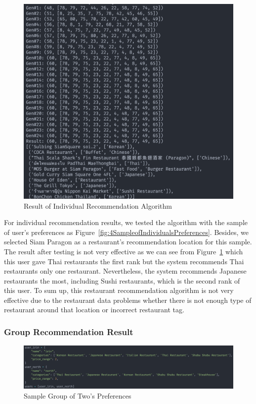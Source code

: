 \documentclass[12pt,oneside,openright,a4paper]{cpe-english-project}
\begin{document}
\begin{figure}[H]\centering
\includegraphics[width=350pt]{./images/4ResultofIndividualRecommendationAlgorithm.png}
\caption{Result of Individual Recommendation Algorithm}\label{fig:4ResultofIndividualRecommendationAlgorithm}
\end{figure}\vspace{-24pt}

For individual recommendation results, we tested the algorithm with the sample of user’s preferences as Figure~\ref{fig:4SampleofIndividualsPreferences}. Besides, we selected Siam Paragon as a restaurant's recommendation location for this sample. The result after testing is not very effective as we can see from Figure~\ref{fig:4ResultofIndividualRecommendationAlgorithm} which this user gave Thai restaurants the first rank but the system recommends Thai restaurants only one restaurant. Nevertheless, the system recommends Japanese restaurants the most, including Sushi restaurants, which is the second rank of this user. To sum up, this restaurant recommendation algorithm is not very effective due to the restaurant data problems whether there is not enough type of restaurant around that location or incorrect restaurant tag.

\subsubsection{Group Recommendation Result}

\begin{figure}[H]\centering
\includegraphics[width=350pt]{./images/4SampleGroupofTwosPreferences.png}
\caption{Sample Group of Two’s Preferences}\label{fig:4SampleGroupofTwosPreferences}
\end{figure}\vspace{-24pt}
\end{document}
